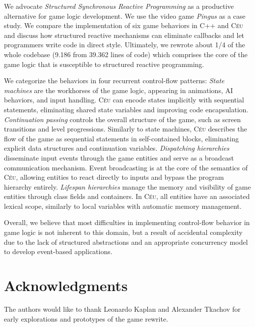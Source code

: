 \documentclass{vgtc}                          %
\newcommand{\CEU}{\textsc{C\'{e}u}\xspace}
\begin{document}
We advocate \emph{Structured Synchronous Reactive Programming} as a productive
alternative for game logic development.
%
We use the video game \emph{Pingus} as a case study.
We compare the implementation of six game behaviors in C++ and \CEU and discuss
how structured reactive mechanisms can eliminate callbacks and let programmers
write code in direct style.
%
Ultimately, we rewrote about 1/4 of the whole codebase (9.186 from 39.362 lines
of code) which comprises the core of the game logic that is susceptible to
structured reactive programming.

We categorize the behaviors in four recurrent control-flow patterns:
%
\emph{State machines} are the workhorses of the game logic, appearing in
animations, AI behaviors, and input handling.
\CEU can encode states implicitly with sequential statements,
eliminating shared state variables and improving code encapsulation.
%
\emph{Continuation passing} controls the overall structure of the game, such as
screen transitions and level progressions.
Similarly to state machines, \CEU describes the flow of the game as sequential
statements in self-contained blocks, eliminating explicit data structures and
continuation variables.
%
\emph{Dispatching hierarchies} disseminate input events through the game
entities and serve as a broadcast communication mechanism.
Event broadcasting is at the core of the semantics of \CEU, allowing entities
to react directly to inputs and bypass the program hierarchy entirely.
%
\emph{Lifespan hierarchies} manage the memory and visibility of game entities
through class fields and containers.
In \CEU, all entities have an associated lexical scope, similarly to local
variables with automatic memory management.

Overall, we believe that most difficulties in implementing control-flow
behavior in game logic is not inherent to this domain, but a result of
accidental complexity due to the lack of structured abstractions and an
appropriate concurrency model to develop event-based applications.

\section{Acknowledgments}

The authors would like to thank Leonardo Kaplan and Alexander Tkachov for early
explorations and prototypes of the game rewrite.



\end{document}

